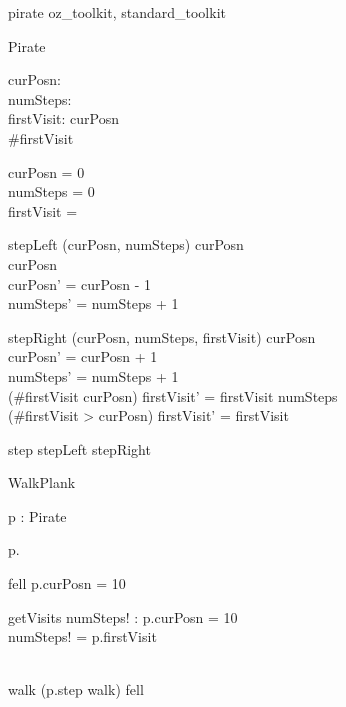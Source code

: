 \documentclass{article}
\begin{document}
\begin{zsection}
  \SECTION pirate \parents oz\_toolkit, standard\_toolkit
\end{zsection}

\begin{class}{Pirate}
\also
	\begin{state}
		curPosn: \nat \\
		numSteps: \nat \\
		firstVisit: \seq \nat
	\where
		curPosn  \\
		\#firstVisit 
	\end{state} \classbreak
	\begin{init}
		curPosn = 0 \\
		numSteps = 0 \\
		firstVisit = \langle \rangle
	\end{init} \classbreak
	\begin{op}{stepLeft}
		\Delta (curPosn, numSteps)
	\where	
	        curPosn  \\
		curPosn \neq 10 \\
		curPosn' = curPosn - 1 \\
		numSteps' = numSteps + 1 \\
	\end{op} \classbreak
	\begin{op}{stepRight}
		\Delta (curPosn, numSteps, firstVisit)
	\where
	        curPosn  \\
        	curPosn' = curPosn + 1 \\
	        numSteps' = numSteps + 1 \\
		(\#firstVisit \leq curPosn) \implies firstVisit' = firstVisit \cat
			\langle numSteps \rangle \\
		(\#firstVisit > curPosn) \implies firstVisit' = firstVisit
	\end{op} \classbreak
	step \sdef stepLeft \gch stepRight
	\end{class}

\begin{class}{WalkPlank}
\also
        \begin{state}
                p : Pirate
        \end{state} \classbreak
	\begin{init}
		p.\Init
	\end{init}\classbreak
	\begin{op}{fell}
        \where
		p.curPosn = 10
	\end{op} \classbreak
	\begin{op}{getVisits}
		numSteps! : \seq \nat
	\where
		p.curPosn = 10\\
		numSteps! = p.firstVisit
	\end{op} \classbreak
	\\
        walk \sdef (p.step \semi walk) \gch fell
\end{class}
\end{document}
